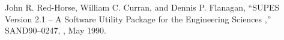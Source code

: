John R. Red-Horse, William C. Curran, and Dennis P. Flanagan, 
``SUPES Version 2.1 -- A Software Utility Package for the Engineering
Sciences ,'' SAND90--0247, \SNLA, May 1990.
